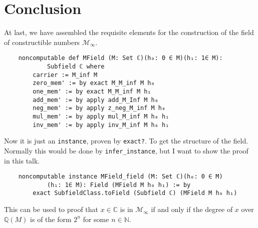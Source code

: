 \section{Conclusion}

At last, we have assembled the requisite elements for the construction of the field of constructible numbers $\mathcal{M}_{\infty}$.
\begin{lstlisting}
    noncomputable def MField (M: Set ℂ)(h₀: 0 ∈ M)(h₁: 1∈ M):
            Subfield ℂ where
        carrier := M_inf M
        zero_mem' := by exact M_M_inf M h₀
        one_mem' := by exact M_M_inf M h₁
        add_mem' := by apply add_M_Inf M h₀
        neg_mem' := by apply z_neg_M_inf M h₀
        mul_mem' := by apply mul_M_inf M h₀ h₁
        inv_mem' := by apply inv_M_inf M h₀ h₁
\end{lstlisting}

Now it is just an \verb|instance|, proven by \verb|exact?|. To get the structure of the field. Normally this would be done by \verb|infer_instance|, but I want to show the proof in this talk.
\begin{lstlisting}
    noncomputable instance MField_field (M: Set ℂ)(h₀: 0 ∈ M)
            (h₁: 1∈ M): Field (MField M h₀ h₁) := by
        exact SubfieldClass.toField (Subfield ℂ) (MField M h₀ h₁)
\end{lstlisting}

This can be used to proof that $x\in \mathbb{C}$ is in $\mathcal{M}_{\infty}$ if and only if the degree of $x$ over $\mathbb{Q}(M)$ is of the form $2^n$ for some $n\in \mathbb{N}$.